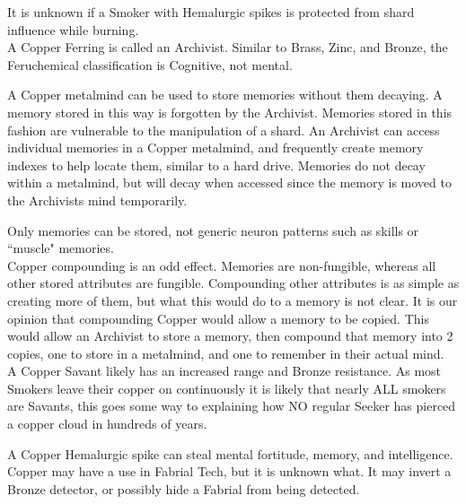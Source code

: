 \documentclass[conference]{IEEEtran}
\begin{document}
It is unknown if a Smoker with Hemalurgic spikes is protected from shard influence while burning.\\

A Copper Ferring is called an Archivist.\cite{ARS}  Similar to Brass, Zinc, and Bronze, the Feruchemical classification is Cognitive, not mental.\cite{FE-TB} 

A Copper metalmind can be used to store memories without them decaying.  A memory stored in this way is forgotten by the Archivist.\cite{ARS}  Memories stored in this fashion are vulnerable to the manipulation of a shard.\cite{WoA-EP}  An Archivist can access individual memories in a Copper metalmind,\cite{copper-ia} and frequently create memory indexes\cite{WoA-CH4} to help locate them, similar to a hard drive.
Memories do not decay within a metalmind, but will decay when accessed since the memory is moved to the Archivists mind temporarily.\cite{WoA-CH15}

Only memories can be stored, not generic neuron patterns such as skills or ``muscle" memories.\cite{copper-no-mm}\\

Copper compounding is an odd effect.  Memories are non-fungible, whereas all other stored attributes are fungible.  Compounding other attributes is as simple as creating more of them, but what this would do to a memory is not clear.  It is our opinion that compounding Copper would allow a memory to be copied.  This would allow an Archivist to store a memory, then compound that memory into 2 copies, one to store in a metalmind, and one to remember in their actual mind.\\
 
A Copper Savant likely has an increased range and Bronze resistance.\cite{savant-pierce}  As most Smokers leave their copper on continuously it is likely that nearly ALL smokers are Savants,\cite{WoF} this goes some way to explaining how NO regular Seeker has pierced a copper cloud in hundreds of years.\cite{TFE-CH31}

A Copper Hemalurgic spike can steal mental fortitude, memory, and intelligence.\cite{HE-TB}\\

Copper may have a use in Fabrial Tech, but it is unknown what.  It may invert a Bronze detector, or possibly hide a Fabrial from being detected.
\end{document}
